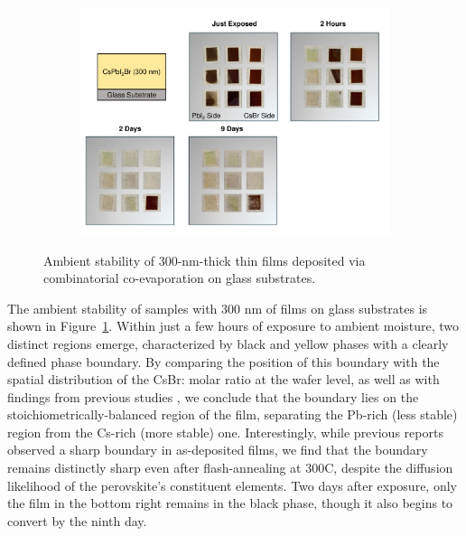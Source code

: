 \begin{figure}[htbp]
    \centering
    \begin{subfigure}[t]{0.99\textwidth}
        \centering
        \includegraphics[width=\textwidth]{chapters/stability/imeges/Stability - No Rotation_275nm_on_glass.pdf} %
               
    \end{subfigure}

    \caption{Ambient stability of 300-nm-thick  thin films deposited via combinatorial co-evaporation on glass substrates.}
    \label{fig:stability:no_rotation:300nm_glass}
\end{figure}


The ambient stability of samples with 300 nm of  films on glass substrates is shown in Figure~\ref{fig:stability:no_rotation:300nm_glass}. Within just a few hours of exposure to ambient moisture, two distinct regions emerge, characterized by black and yellow phases with a clearly defined phase boundary. By comparing the position of this boundary with the spatial distribution of the CsBr: molar ratio at the wafer level, as well as with findings from previous studies \cite{Becker2019LowExperimentation, Lin2024FormationTreatment}, we conclude that the boundary lies on the stoichiometrically-balanced region of the film, separating the Pb-rich (less stable) region from the Cs-rich (more stable) one. Interestingly, while previous reports observed a sharp boundary in as-deposited films, we find that the boundary remains distinctly sharp even after flash-annealing at 300\degree C, despite the diffusion likelihood of the perovskite's constituent elements. Two days after exposure, only the film in the bottom right remains in the black phase, though it also begins to convert by the ninth day.


